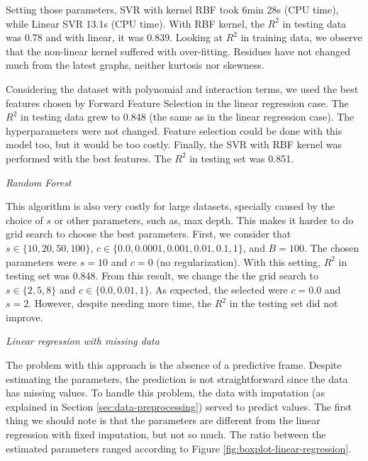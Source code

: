 Setting those parameters, SVR with kernel RBF took 6min 28s (CPU time), while
Linear SVR 13.1s (CPU time). With RBF kernel, the $R^2$ in testing data was 0.78 and
with linear, it was 0.839. Looking at $R^2$ in training data, we observe that
the non-linear kernel suffered with over-fitting. Residues have not changed
much from the latest graphs, neither kurtosis nor skewness.

Considering the dataset with polynomial and interaction terms, we used the
best features chosen by Forward Feature Selection in the linear regression case. The
$R^2$ in testing data grew to 0.848 (the same as in the linear regression
case). The hyperparameters were not changed. Feature selection could be done with this model too, but it would be
too costly. Finally, the SVR with RBF kernel was performed with the best
features. The $R^2$ in testing set was 0.851. 

\vspace{2mm}

{\em Random Forest} 

\vspace{2mm}

This algorithm is also very costly for large datasets, specially caused by the
choice of $s$ or other parameters, such as, max depth. This makes it harder to
do grid search to choose the best parameters. First, we consider that $s \in
\{10, 20, 50, 100\}$, $c \in \{0.0, 0.0001, 0.001, 0.01, 0.1, 1\}$, and $B =
100$. The chosen parameters were $s = 10$ and $c = 0$ (no regularization).
With this setting, $R^2$ in testing set was 0.848. From this result, we change
the the grid search to $s \in
\{2, 5, 8\}$ and $c \in \{0.0, 0.01, 1\}$. As expected, the selected were $c =
0.0$ and $s = 2$. However, despite needing more time, the $R^2$ in the testing
set did not improve. 

\vspace{2mm}

{\em Linear regression with missing data} 

\vspace{2mm}

The problem with this approach is the absence of a predictive frame. Despite
estimating the parameters, the prediction is not straightforward since the
data has missing values. To handle this problem, the data with imputation (as
explained in Section \ref{sec:data-preprocessing}) served to predict values.
The first thing we should note is that the parameters are different from
the linear regression with fixed imputation, but not so much. The ratio
between the estimated parameters ranged according to Figure
\ref{fig:boxplot-linear-regression}. 

